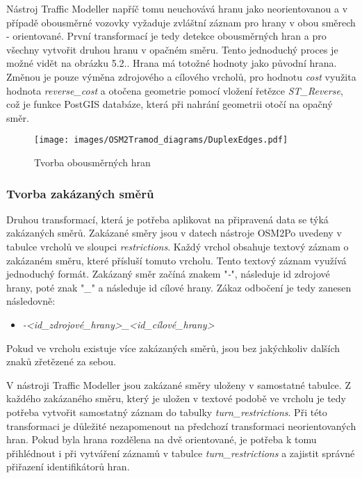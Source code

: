 Nástroj Traffic Modeller napříč tomu neuchovává hranu jako neorientovanou a v případě obousměrné vozovky vyžaduje zvláštní záznam pro hrany v obou směrech - orientované. První transformací je tedy detekce obousměrných hran a pro všechny vytvořit druhou hranu v opačném směru. Tento jednoduchý proces je možné vidět na obrázku 5.2.. Hrana má totožné hodnoty jako původní hrana. Změnou je pouze výměna zdrojového a cílového vrcholů, pro hodnotu \textit{cost} využita hodnota \textit{reverse\_cost} a otočena geometrie pomocí vložení řetězce \textit{ST\_Reverse}, což je funkce PostGIS databáze, která při nahrání geometrii otočí na opačný směr. 

\begin{figure}[htbp]
\centering
\texttt{[image: images/OSM2Tramod\_diagrams/DuplexEdges.pdf]}
\caption{Tvorba obousměrných hran}
\end{figure}
\vspace{10pt}

\subsubsection{Tvorba zakázaných směrů}
\label{tvorba_zakazanych_smeru}

Druhou transformací, která je potřeba aplikovat na připravená data se týká zakázaných směrů. Zakázané směry jsou v datech nástroje OSM2Po uvedeny v tabulce vrcholů ve sloupci \textit{restrictions}. Každý vrchol obsahuje textový záznam o zakázaném směru, které přísluší tomuto vrcholu. Tento textový záznam využívá jednoduchý formát. Zakázaný směr začíná znakem "\textit{-}", následuje id zdrojové hrany, poté znak "\textit{\_}" a následuje id cílové hrany. Zákaz odbočení je tedy zanesen následovně: 
\begin{itemize}
 \item \textit{-\textless id\_zdrojové\_hrany\textgreater\_\textless id\_cílové\_hrany\textgreater}
\end{itemize}
Pokud ve vrcholu existuje více zakázaných směrů, jsou bez jakýchkoliv dalších znaků zřetězené za sebou. 

V nástroji Traffic Modeller jsou zakázané směry uloženy v samostatné tabulce. Z každého zakázaného směru, který je uložen v textové podobě ve vrcholu je tedy potřeba vytvořit samostatný záznam do tabulky \textit{turn\_restrictions}. Při této transformaci je důležité nezapomenout na předchozí transformaci neorientovaných hran. Pokud byla hrana rozdělena na dvě orientované, je potřeba k tomu přihlédnout i při vytváření záznamů v tabulce \textit{turn\_restrictions} a zajistit správné přiřazení identifikátorů hran. 

